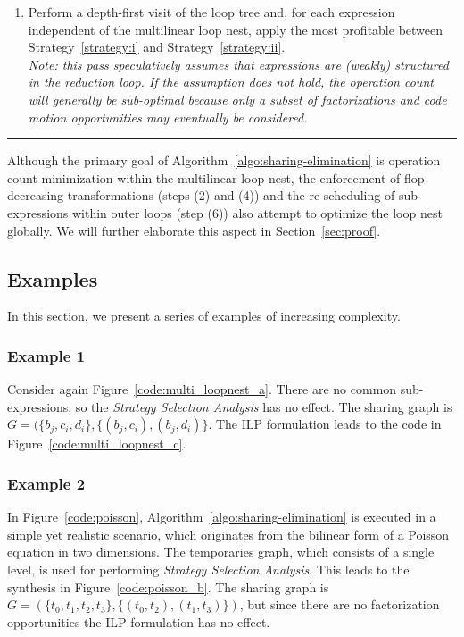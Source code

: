 \begin{Algo}
\begin{enumerate}
\item Perform a depth-first visit of the loop tree and, for each expression independent of the multilinear loop nest, apply the most profitable between Strategy~\ref{strategy:i} and Strategy~\ref{strategy:ii}. \\
\textit{Note: this pass speculatively assumes that expressions are (weakly) structured in the reduction loop. If the assumption does not hold, the operation count will generally be sub-optimal because only a subset of factorizations and code motion opportunities may eventually be considered.}
\end{enumerate}
\end{Algo}

\noindent\rule[1.0ex]{\linewidth}{0.7pt}

Although the primary goal of Algorithm~\ref{algo:sharing-elimination} is operation count minimization within the multilinear loop nest, the enforcement of flop-decreasing transformations (steps (2) and (4)) and the re-scheduling of sub-expressions within outer loops (step (6)) also attempt to optimize the loop nest globally. We will further elaborate this aspect in Section~\ref{sec:proof}.


\subsection{Examples}
\label{sec:se-examples}
In this section, we present a series of examples of increasing complexity.

\subsubsection{Example 1}
Consider again Figure~\ref{code:multi_loopnest_a}. There are no common sub-expressions, so the {\em Strategy Selection Analysis} has no effect. The sharing graph is $G = (\lbrace b_j, c_i, d_i \rbrace, \lbrace (b_j, c_i), (b_j, d_i) \rbrace$. The ILP formulation leads to the code in Figure~\ref{code:multi_loopnest_c}.

\subsubsection{Example 2}
In Figure~\ref{code:poisson}, Algorithm~\ref{algo:sharing-elimination} is executed in a simple yet realistic scenario, which originates from the bilinear form of a Poisson equation in two dimensions. The temporaries graph, which consists of a single level, is used for performing {\em Strategy Selection Analysis}. This leads to the synthesis in Figure~\ref{code:poisson_b}. The sharing graph is $G = (\lbrace t_0, t_1, t_2, t_3 \rbrace, \lbrace (t_0, t_2), (t_1, t_3) \rbrace)$, but since there are no factorization opportunities the ILP formulation has no effect.

